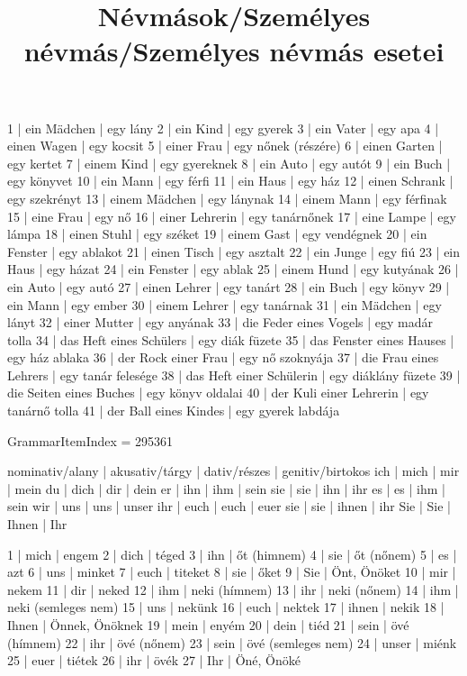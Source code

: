 \begin{exmp}
1 | ein Mädchen | egy lány
2 | ein Kind | egy gyerek
3 | ein Vater | egy apa
4 | einen Wagen | egy kocsit
5 | einer Frau | egy nőnek (részére)
6 | einen Garten | egy kertet
7 | einem Kind | egy gyereknek
8 | ein Auto | egy autót
9 | ein Buch | egy könyvet
10 | ein Mann | egy férfi
11 | ein Haus | egy ház
12 | einen Schrank | egy szekrényt
13 | einem Mädchen | egy lánynak
14 | einem Mann | egy férfinak
15 | eine Frau | egy nő
16 | einer Lehrerin | egy tanárnőnek
17 | eine Lampe | egy lámpa
18 | einen Stuhl | egy széket
19 | einem Gast | egy vendégnek
20 | ein Fenster | egy ablakot
21 | einen Tisch | egy asztalt
22 | ein Junge | egy fiú
23 | ein Haus | egy házat
24 | ein Fenster | egy ablak
25 | einem Hund | egy kutyának
26 | ein Auto | egy autó
27 | einen Lehrer | egy tanárt
28 | ein Buch | egy könyv
29 | ein Mann | egy ember
30 | einem Lehrer | egy tanárnak
31 | ein Mädchen | egy lányt
32 | einer Mutter | egy anyának
33 | die Feder eines Vogels | egy madár tolla
34 | das Heft eines Schülers | egy diák füzete
35 | das Fenster eines Hauses | egy ház ablaka
36 | der Rock einer Frau | egy nő szoknyája
37 | die Frau eines Lehrers | egy tanár felesége
38 | das Heft einer Schülerin | egy diáklány füzete
39 | die Seiten eines Buches | egy könyv oldalai
40 | der Kuli einer Lehrerin | egy tanárnő tolla
41 | der Ball eines Kindes | egy gyerek labdája
\end{exmp}

\title{Névmások/Személyes névmás/Személyes névmás esetei}

GrammarItemIndex = 295361

\begin{desc}
nominativ/alany | akusativ/tárgy | dativ/részes | genitiv/birtokos
ich             | mich           | mir          | mein
du              | dich           | dir          | dein 
er              | ihn            | ihm          | sein
sie             | sie            | ihn          | ihr
es              | es             | ihm          | sein
wir             | uns            | uns          | unser
ihr             | euch           | euch         | euer
sie             | sie            | ihnen        | ihr
Sie             | Sie            | Ihnen        | Ihr 
\end{desc}

\begin{exmp}
1 | mich | engem
2 | dich | téged
3 | ihn | őt (himnem)
4 | sie | őt (nőnem)
5 | es | azt
6 | uns | minket
7 | euch | titeket
8 | sie | őket
9 | Sie | Önt, Önöket
10 | mir | nekem
11 | dir | neked
12 | ihm | neki (hímnem)
13 | ihr | neki (nőnem)
14 | ihm | neki (semleges nem)
15 | uns | nekünk
16 | euch | nektek
17 | ihnen | nekik
18 | Ihnen | Önnek, Önöknek
19 | mein | enyém
20 | dein | tiéd
21 | sein | övé (hímnem)
22 | ihr | övé (nőnem)
23 | sein | övé (semleges nem)
24 | unser | miénk
25 | euer | tiétek
26 | ihr | övék
27 | Ihr | Öné, Önöké
\end{exmp}

